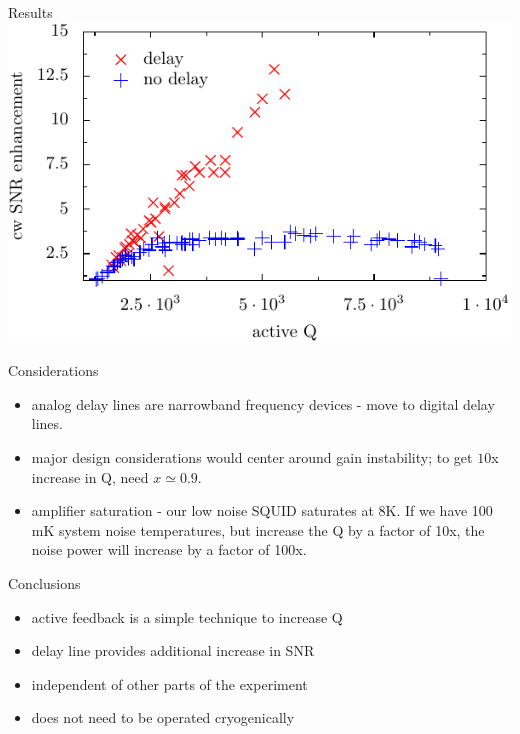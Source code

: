 \documentclass{beamer}
\begin{document}
\begin{frame}{Results}
\includegraphics[width=\textwidth]{experiment}
\end{frame}

\begin{frame}{Considerations}
\begin{itemize}
\item analog delay lines are narrowband frequency devices - move to digital delay lines.
\item major design considerations would center around gain instability; to get $10$x increase in Q, need $x \simeq 0.9$.
\item amplifier saturation - our low noise SQUID saturates at 8K. If we have 100 mK system noise temperatures, but increase the Q by a factor of 10x, the noise power will increase by a factor of 100x.
\end{itemize}
\end{frame}

\begin{frame}{Conclusions}
\begin{itemize}
\item active feedback is a simple technique to increase Q
\item delay line provides additional increase in SNR
\item independent of other parts of the experiment
\item does not need to be operated cryogenically
\end{itemize}
\end{frame}
\end{document}
